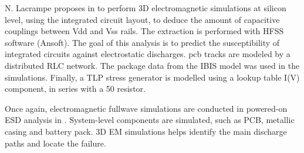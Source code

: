 N. Lacrampe proposes in \cite{LacrampeTransientImmunity} to perform 3D electromagnetic simulations at silicon level, using the integrated circuit layout, to deduce the amount of capacitive couplings between Vdd and Vss rails.
The extraction is performed with HFSS software (Ansoft).
The goal of this analysis is to predict the susceptibility of integrated circuits against electrostatic discharges.
\gls{pcb} tracks are modeled by a distributed RLC network.
The package data from the IBIS model \cite{ibis-spec} was used in the simulations.
Finally, a TLP stress generator is modelled using a lookup table I(V) component, in series with a 50\textOmega{} resistor.

Once again, electromagnetic fullwave simulations are conducted in powered-on ESD analysis in \cite{softFailMobile}.
System-level components are simulated, such as PCB, metallic casing and battery pack.
3D EM simulations helps identify the main discharge paths and locate the failure.
